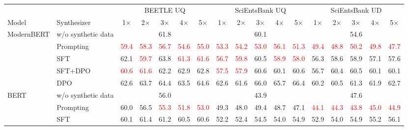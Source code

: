 
\begin{table}[t]
\centering
\footnotesize
\setlength{\tabcolsep}{2pt}
\begin{tabular}{llccccccccccccccc}
\toprule
 & & \multicolumn{5}{c}{BEETLE UQ} & \multicolumn{5}{c}{SciEntsBank UQ} & \multicolumn{5}{c}{SciEntsBank UD} \\
\cmidrule(lr){3-7}\cmidrule(lr){8-12}\cmidrule(lr){13-17}
Model & Synthesizer & 1$\times$ & 2$\times$ & 3$\times$ & 4$\times$ & 5$\times$ & 1$\times$ & 2$\times$ & 3$\times$ & 4$\times$ & 5$\times$ & 1$\times$ & 2$\times$ & 3$\times$ & 4$\times$ & 5$\times$ \\
\midrule
\multirow{5}{*}{ModernBERT} & w/o synthetic data & \multicolumn{5}{c}{61.8} & \multicolumn{5}{c}{60.1} & \multicolumn{5}{c}{54.6} \\
 & Prompting & \textcolor{red}{59.4} & \textcolor{red}{58.3} & \textcolor{red}{56.7} & \textcolor{red}{54.6} & \textcolor{red}{55.0} & \textcolor{red}{53.3} & \textcolor{red}{54.2} & \textcolor{red}{53.0} & \textcolor{red}{56.1} & \textcolor{red}{51.3} & \textcolor{red}{49.4} & \textcolor{red}{48.8} & \textcolor{red}{50.2} & \textcolor{red}{49.8} & \textcolor{red}{47.7} \\
 & SFT & 62.1 & \textcolor{red}{59.7} & 63.8 & \textcolor{red}{61.3} & \textcolor{red}{61.6} & \textcolor{red}{56.7} & \textcolor{red}{59.8} & 60.5 & \textcolor{red}{58.9} & \textcolor{red}{58.0} & 56.3 & 58.6 & 58.9 & 57.1 & 57.6 \\
 & SFT+DPO & \textcolor{red}{60.6} & \textcolor{red}{61.6} & 62.2 & 62.9 & 62.8 & \textcolor{red}{57.5} & \textcolor{red}{57.9} & 60.6 & 60.1 & 60.6 & 56.7 & 60.4 & 60.5 & 60.1 & 60.1 \\
 & DPO & 62.6 & 63.7 & 64.4 & 63.5 & 64.6 & 62.6 & 61.6 & 66.0 & 65.7 & 66.4 & 60.2 & 60.5 & 61.3 & 61.9 & 62.7 \\
\midrule
\multirow{5}{*}{BERT} & w/o synthetic data & \multicolumn{5}{c}{56.0} & \multicolumn{5}{c}{43.9} & \multicolumn{5}{c}{47.6} \\
 & Prompting & 60.0 & 56.5 & \textcolor{red}{55.3} & \textcolor{red}{51.8} & \textcolor{red}{53.0} & 49.3 & 48.0 & 49.4 & 48.7 & 47.1 & \textcolor{red}{44.1} & \textcolor{red}{44.3} & \textcolor{red}{43.8} & \textcolor{red}{45.0} & \textcolor{red}{44.9} \\
 & SFT & 60.1 & 61.4 & 61.2 & 60.5 & 60.6 & 52.2 & 52.4 & 54.5 & 54.0 & 54.9 & 52.9 & 54.0 & 54.9 & 55.2 & 56.1 \\

\end{tabular}
\end{table}
